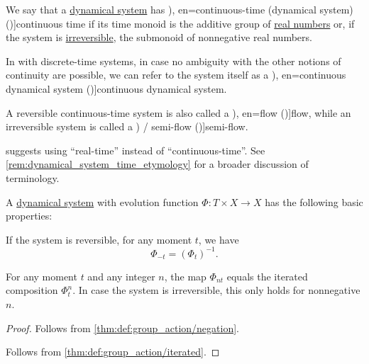 \begin{definition}\label{def:continuous_dynamical_system}\mimprovised
  We say that a \hyperref[def:dynamical_system]{dynamical system} has \term[ru=(динамическая система с) непрерывным временем (\cite[8]{Юмагулов2015ДинамическиеСистемы}), en=continuous-time (dynamical system) (\cite[2]{BrinStuck2002DynamicalSystems})]{continuous time} if its time monoid is the additive group of \hyperref[def:real_numbers]{real numbers} or, if the system is \hyperref[def:reversible_dynamical_system]{irreversible}, the submonoid of nonnegative real numbers.

  In with discrete-time systems, in case no ambiguity with the other notions of continuity are possible, we can refer to the system itself as a \term[ru=непрарывная динамическая система (\cite[8]{Юмагулов2015ДинамическиеСистемы}), en=continuous dynamical system (\cite[21]{Müller2022HandbookOfDynamicsAndProbability})]{continuous dynamical system}.

  A reversible continuous-time system is also called a \term[ru=поток (\cite[10]{Юмагулов2015ДинамическиеСистемы}), en=flow (\cite[2]{BrinStuck2002DynamicalSystems})]{flow}, while an irreversible system is called a \term[en=semiflow (\cite[2]{BrinStuck2002DynamicalSystems}) / semi-flow (\cite[363]{Rozikov2012MultiDimensionalTimeDynamicalSystem})]{semi-flow}.
\end{definition}
\begin{comments}
  \item {} suggests using \enquote{real-time} instead of \enquote{continuous-time}. See \cref{rem:dynamical_system_time_etymology} for a broader discussion of terminology.
\end{comments}

\begin{proposition}\label{thm:def:dynamical_system}
  A \hyperref[def:dynamical_system]{dynamical system} with evolution function \( \Phi: T \times X \to X \) has the following basic properties:
  \begin{thmenum}
     If the system is reversible, for any moment \( t \), we have
    \begin{equation}\label{eq:thm:def:dynamical_system/negation}
      \Phi_{-t} = (\Phi_t)^{-1}.
    \end{equation}

     For any moment \( t \) and any integer \( n \), the map \( \Phi_{nt} \) equals the iterated composition \( \Phi_t^n \). In case the system is irreversible, this only holds for nonnegative \( n \).
  \end{thmenum}
\end{proposition}
\begin{proof}
   Follows from \cref{thm:def:group_action/negation}.

   Follows from \cref{thm:def:group_action/iterated}.
\end{proof}

